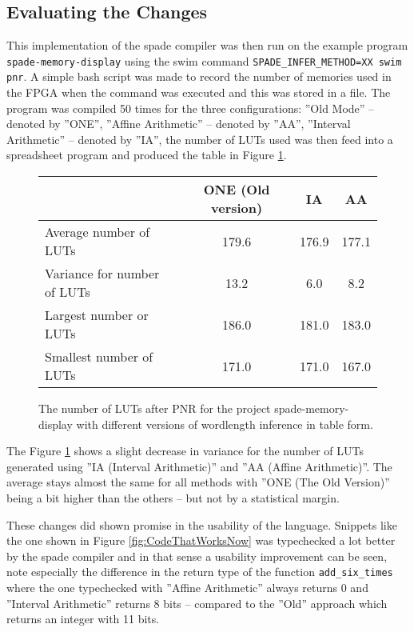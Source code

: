 \subsection{Evaluating the Changes}
This implementation of the spade compiler was then run on the example program \verb+spade-memory-display+ using the swim command \verb+SPADE_INFER_METHOD=XX swim pnr+. A simple bash script was made to record the number of memories used in the FPGA when the command was executed and this was stored in a file. The program was compiled 50 times for the three configurations: ''Old Mode'' -- denoted by ''ONE'', ''Affine Arithmetic'' -- denoted by ''AA'', ''Interval Arithmetic'' -- denoted by ''IA'', the number of LUTs used was then feed into a spreadsheet program and produced the table in Figure \ref{fig:SpadeCompilations50Table}.

\begin{figure}
\begin{center}
\begin{tabular}{l | c c c}
  & ONE (Old version) & IA & AA \\
\hline
Average number of LUTs&179.6&176.9 & 177.1 \\
Variance for number of LUTs &13.2&6.0&8.2 \\
Largest number or LUTs&186.0&181.0&183.0 \\
Smallest number of LUTs&171.0&171.0&167.0 \\
\end{tabular}
  \caption{The number of LUTs after PNR for the project spade-memory-display with different versions of wordlength inference in table form.}
  \label{fig:SpadeCompilations50Table}
\end{center}
\end{figure}


The Figure \ref{fig:SpadeCompilations50Table} shows a slight decrease in variance for the number of LUTs generated using ''IA (Interval Arithmetic)'' and ''AA (Affine Arithmetic)''. The average stays almost the same for all methods with ''ONE (The Old Version)'' being a bit higher than the others -- but not by a statistical margin.

These changes did shown promise in the usability of the language. Snippets like the one shown in Figure \ref{fig:CodeThatWorksNow} was typechecked a lot better by the spade compiler and in that sense a usability improvement can be seen, note especially the difference in the return type of the function \verb+add_six_times+ where the one typechecked with ''Affine Arithmetic'' always returns 0 and ''Interval Arithmetic'' returns 8 bits -- compared to the ''Old'' approach which returns an integer with 11 bits. %

